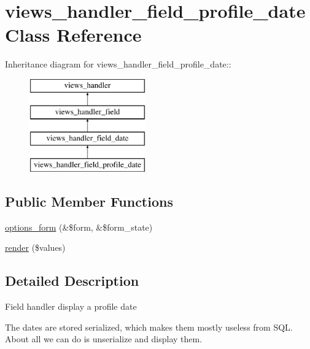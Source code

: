 \hypertarget{classviews__handler__field__profile__date}{
\section{views\_\-handler\_\-field\_\-profile\_\-date Class Reference}
\label{classviews__handler__field__profile__date}
}
Inheritance diagram for views\_\-handler\_\-field\_\-profile\_\-date::\begin{figure}[H]
\begin{center}
\leavevmode
\includegraphics[height=4cm]{classviews__handler__field__profile__date}
\end{center}
\end{figure}
\subsection*{Public Member Functions}
\begin{DoxyCompactItemize}
\item 
\hyperlink{classviews__handler__field__profile__date_aede3f5f93411ff64dd780b9837d19aec}{options\_\-form} (\&\$form, \&\$form\_\-state)
\item 
\hyperlink{classviews__handler__field__profile__date_acac0d13ae857ccb63e8fe338c8e4dde4}{render} (\$values)
\end{DoxyCompactItemize}


\subsection{Detailed Description}
Field handler display a profile date

The dates are stored serialized, which makes them mostly useless from SQL. About all we can do is unserialize and display them. 

